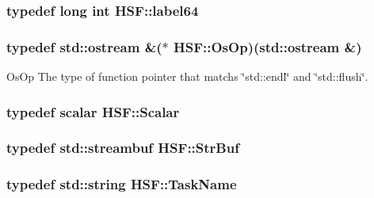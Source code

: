 \label{namespaceHSF_afc477bc8f9a048e05aa8a6d017cf8cae}
\hypertarget{namespaceHSF_a650f5d5e5fa910ac122802bc38916ca9}{
\subsubsection[{label64}]{\setlength{\rightskip}{0pt plus 5cm}typedef long int {\bf HSF::label64}}}
\label{namespaceHSF_a650f5d5e5fa910ac122802bc38916ca9}
\hypertarget{namespaceHSF_a5c97750573f23c09a9fed0efa5baa52d}{
\subsubsection[{OsOp}]{\setlength{\rightskip}{0pt plus 5cm}typedef std::ostream \&($\ast$ {\bf HSF::OsOp})(std::ostream \&)}}
\label{namespaceHSF_a5c97750573f23c09a9fed0efa5baa52d}


OsOp The type of function pointer that matchs \char`\"{}std::endl\char`\"{} and \char`\"{}std::flush\char`\"{}. \hypertarget{namespaceHSF_a7419497552ed1c5631a818b75eed1aec}{
\subsubsection[{Scalar}]{\setlength{\rightskip}{0pt plus 5cm}typedef scalar {\bf HSF::Scalar}}}
\label{namespaceHSF_a7419497552ed1c5631a818b75eed1aec}
\hypertarget{namespaceHSF_a099dd77b4cb045fbbd0fb0dd0946e198}{
\subsubsection[{StrBuf}]{\setlength{\rightskip}{0pt plus 5cm}typedef std::streambuf {\bf HSF::StrBuf}}}
\label{namespaceHSF_a099dd77b4cb045fbbd0fb0dd0946e198}
\hypertarget{namespaceHSF_a928eb958edfcd09f62de19e9cd3bac70}{
\subsubsection[{TaskName}]{\setlength{\rightskip}{0pt plus 5cm}typedef std::string {\bf HSF::TaskName}}}
\label{namespaceHSF_a928eb958edfcd09f62de19e9cd3bac70}


